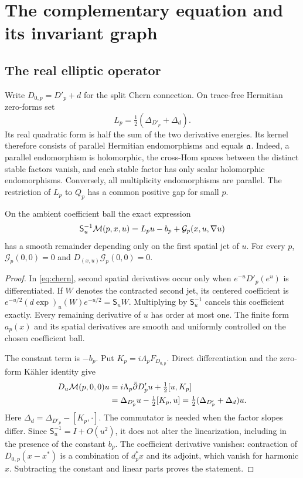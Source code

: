 \section{The complementary equation and its invariant graph}\label{sec:graph}

\subsection{The real elliptic operator}
Write $D_{0,p}=D'_p+d$ for the split Chern connection. On
trace-free Hermitian zero-forms set
\begin{equation}\label{eq:real-operator}
 L_p=\tfrac12(\Delta_{D'_p}+\Delta_d).
\end{equation}
Its real quadratic form is half the sum of the two derivative
energies. Its kernel therefore consists of parallel Hermitian
endomorphisms and equals $\mathfrak a$. Indeed, a parallel endomorphism
is holomorphic, the cross-Hom spaces between the distinct stable
factors vanish, and each stable factor has only scalar holomorphic
endomorphisms. Conversely, all multiplicity endomorphisms are
parallel. The restriction of $L_p$ to $Q_p$ has a common positive
gap for small $p$.

\begin{lemma}\label{lem:first-jet}
On the ambient coefficient ball the exact expression
\begin{equation}\label{eq:first-jet}
 \mathsf S_u^{-1}\mathcal M(p,x,u)
     =L_pu-b_p+\mathcal G_p(x,u,\nabla u)
\end{equation}
has a smooth remainder depending only on the first spatial jet
of $u$. For every $p$,
$\mathcal G_p(0,0)=0$ and
$D_{(x,u)}\mathcal G_p(0,0)=0$.
\end{lemma}

\begin{proof}
In \eqref{eq:chern}, second spatial derivatives occur only when
$e^{-u}D'_p(e^u)$ is differentiated. If $W$ denotes the
contracted second jet, its centered coefficient is
$e^{-u/2}(d\exp)_u(W)e^{-u/2}=\mathsf S_uW$.
Multiplying by $\mathsf S_u^{-1}$ cancels this coefficient
exactly. Every remaining derivative of $u$ has order at most one.
The finite form $a_p(x)$ and its spatial derivatives are smooth
and uniformly controlled on the chosen coefficient ball.

The constant term is $-b_p$. Put
$K_p=i\Lambda_pF_{D_{0,p}}$. Direct differentiation and the
zero-form K\"ahler identity give
\begin{align}
 D_u\mathcal M(p,0,0)u
 &=i\Lambda_p\bar\partial D'_pu+\tfrac12[u,K_p]\notag\\
 &=\Delta_{D'_p}u-\tfrac12[K_p,u]
   =\tfrac12(\Delta_{D'_p}+\Delta_d)u. \label{eq:centered-linear}
\end{align}
Here $\Delta_d=\Delta_{D'_p}-[K_p,\cdot]$. The commutator
is needed when the factor slopes differ. Since
$\mathsf S_u^{-1}=I+O(u^2)$, it does not alter the
linearization, including in the presence of the constant $b_p$.
The coefficient derivative vanishes: contraction of
$D_{0,p}(x-x^*)$ is a combination of $d_p^*x$ and its adjoint,
which vanish for harmonic $x$. Subtracting the constant and
linear parts proves the statement.
\end{proof}

